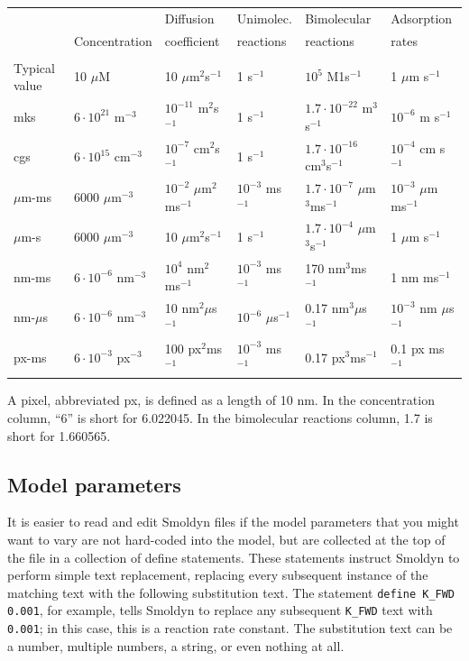 \documentclass {book}
\newcommand {\ttt} {\texttt}
\begin{document}
\begin{longtable}[c]{llllll}
&& Diffusion & Unimolec. & Bimolecular & Adsorption\\
& Concentration & coefficient & reactions & reactions & rates\\
\hline \\
Typical value & 10 $\mu$M & 10 $\mu$m$^2$s$^{-1}$ & 1 s$^{-1}$ & $10^5$ M1s$^{-1}$ & 1 $\mu$m s$^{-1}$\\
mks & $6\cdot10^{21}$ m$^{-3}$ & $10^{-11}$ m$^2$s$^{-1}$ & 1 s$^{-1}$ & $1.7\cdot10^{-22}$ m$^3$s$^{-1}$ & $10^{-6}$ m s$^{-1}$\\
cgs & $6\cdot10^{15}$ cm$^{-3}$ & $10^{-7}$ cm$^2$s$^{-1}$ & 1 s$^{-1}$ & $1.7\cdot10^{-16}$ cm$^3$s$^{-1}$ & $10^{-4}$ cm s$^{-1}$\\
$\mu$m-ms & 6000 $\mu$m$^{-3}$ & $10^{-2}$ $\mu$m$^2$ms$^{-1}$ & $10^{-3}$ ms$^{-1}$ & $1.7\cdot10^{-7}$ $\mu$m$^3$ms$^{-1}$ & $10^{-3}$ $\mu$m ms$^{-1}$\\
$\mu$m-s & 6000 $\mu$m$^{-3}$ & 10 $\mu$m$^2$s$^{-1}$ & 1 s$^{-1}$ & $1.7\cdot10^{-4}$ $\mu$m$^3$s$^{-1}$ & 1 $\mu$m s$^{-1}$\\
nm-ms & $6\cdot10^{-6}$ nm$^{-3}$ & $10^4$ nm$^2$ms$^{-1}$ & $10^{-3}$ ms$^{-1}$ & 170 nm$^3$ms$^{-1}$ & 1 nm ms$^{-1}$\\
nm-$\mu$s & $6\cdot10^{-6}$ nm$^{-3}$ & 10 nm$^2$$\mu$s$^{-1}$ & $10^{-6}$ $\mu$s$^{-1}$ & 0.17 nm$^3$$\mu$s$^{-1}$ & $10^{-3}$ nm $\mu$s$^{-1}$\\
px-ms & $6\cdot10^{-3}$ px$^{-3}$ & 100 px$^2$ms$^{-1}$ & $10^{-3}$ ms$^{-1}$ & 0.17 px$^3$ms$^{-1}$ & 0.1 px ms$^{-1}$\\
\end{longtable}

A pixel, abbreviated px, is defined as a length of 10 nm. In the concentration column, ``6'' is short for 6.022045. In the bimolecular reactions column, 1.7 is short for 1.660565.

\subsection*{Model parameters}

It is easier to read and edit Smoldyn files if the model parameters that you might want to vary are not hard-coded into the model, but are collected at the top of the file in a collection of define statements. These statements instruct Smoldyn to perform simple text replacement, replacing every subsequent instance of the matching text with the following substitution text. The statement  \ttt{define K\_FWD 0.001}, for example, tells Smoldyn to replace any subsequent  \ttt{K\_FWD} text with  \ttt{0.001}; in this case, this is a reaction rate constant. The substitution text can be a number, multiple numbers, a string, or even nothing at all.
\end{document}
